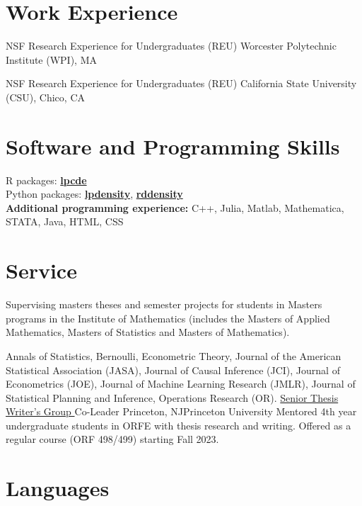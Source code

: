 \documentclass[10pt,a4paper,roman]{moderncv}        %
\begin{document}
\section{Work Experience}
{NSF Research Experience for Undergraduates (REU) }
{Worcester Polytechnic Institute (WPI), MA}
{} {
}

{NSF Research Experience for Undergraduates (REU)}
{California State University (CSU), Chico, CA}
{}
{}

\vspace{-0.3cm}
\section{Software and Programming Skills}
R packages:
\color{blue}\href{https://nppackages.github.io/lpcde/}{\textbf{lpcde}}\color{black}
\\
Python packages: \color{blue}\href{https://nppackages.github.io/lpdensity_doc/}
{\textbf{lpdensity}}\color{black},
\color{blue}\href{https://rdpackages.github.io/rddensity_doc/}
{\textbf{rddensity}}\color{black}
\\
\textbf{Additional programming experience:}
C++, Julia, Matlab, Mathematica, STATA, Java, HTML, CSS
\vspace{-0.3cm}
\section{Service}
{}
{Supervising masters theses and semester projects for students in Masters programs in
  the Institute of Mathematics (includes the Masters of Applied Mathematics,
  Masters of Statistics and Masters of Mathematics).}

{}
{}

{}
{
  Annals of Statistics,
  Bernoulli,
  Econometric Theory,
  Journal of the American Statistical Association (JASA),
  Journal of Causal Inference (JCI),
  Journal of Econometrics (JOE),
  Journal of Machine Learning Research (JMLR),
  Journal of Statistical Planning and Inference,
  Operations Research (OR).
}
{\color{blue}\href{https://orfe.princeton.edu/undergraduate/stwg}{Senior Thesis
    Writer's Group }\color{black} Co-Leader}
{Princeton, NJ}{Princeton University}
{Mentored 4th year undergraduate students in ORFE with thesis research and
  writing. Offered as a regular course (ORF 498/499) starting Fall 2023.
}
\vspace{-0.3cm}
\section{Languages}
\begin{cvcolumns}
\end{cvcolumns}

\clearpage
\end{document}
